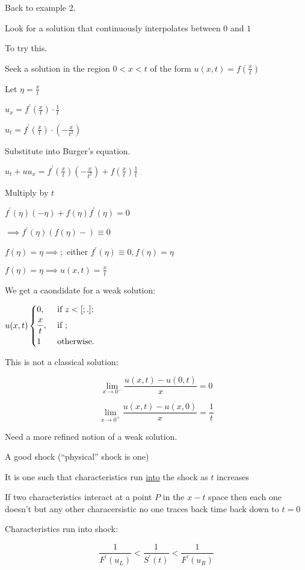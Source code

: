\documentclass{article}
\theoremstyle{definition}
\begin{document}
Back to example 2.

Look for a solution that continuously interpolates between \(0\) and \(1\)

To try this.

Seek a solution in the region \(0 < x < t\) of the form \(u(x,t)=f(\frac{x}{t})\)

Let \(\eta = \frac{x}{t}\)

\(u_x = f^{\prime} (\frac{x}{t})\cdot \frac{1}{t}\)

\(u_t = f^{\prime} (\frac{x}{t})\cdot(-\frac{x}{t^2})\) 

Substitute into Burger's equation.

\(u_t + u u_x = f^{\prime} (\frac{x}{t})(-\frac{x}{t^2})+f(\frac{x}{t})\frac{1}{t}\) 

Multiply by \(t\) 

\(f^{\prime} (\eta)(-\eta)+f(\eta)f^{\prime} (\eta)=0\)

\(\implies f^{\prime} (\eta)(f(\eta)-)\equiv 0\) 

\(f(\eta)=\eta \implies ;\) either \(f^{\prime}(\eta)\equiv 0, f(\eta)=\eta\) 

\(f(\eta)=\eta \implies u(x,t)=\frac{x}{t}\) 

We get a caondidate for a weak solution:

\(u(x,t)\begin{dcases}
    0, &\text{ if }  z <[;.];\\
    \frac{x}{t}, &\text{ if }  ;\\
    1 &\text{ otherwise} .
\end{dcases}\) 

This is not a classical solution:

\[
    \lim_{x \to 0^-} \frac{u(x,t)-u(0,t)}{x}=0
\]

\[
    \lim_{x \to 0^+} \frac{u(x,t)-u(x,0)}{x} = \frac{1}{t} 
\]

Need a more refined notion of a weak solution.

A good shock (``physical'' shock is one)

It is one such that characteristics run \underline{into} the shock as \(t\) increases

If two characteristics interact at a point \(P\) in the \(x-t\) space then each one doesn't but any other characersistic no one traces back time back down to \(t=0\) 

Characteristics run into shock:

\[
    \frac{1}{F^{\prime}(u_L)} < \frac{1}{S^{\prime}(t)} < \frac{1}{F^{\prime}(u_R)}
\]
\end{document}
